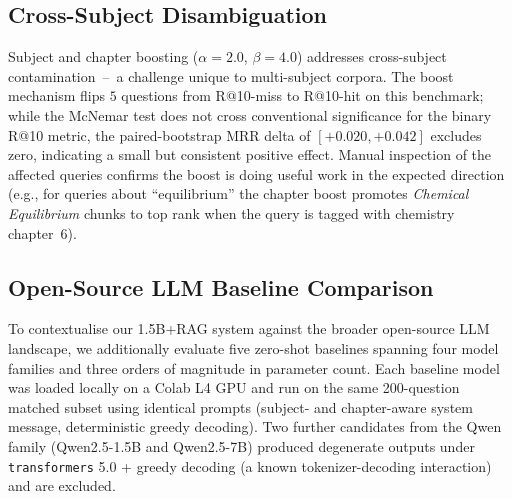 \documentclass[conference]{IEEEtran}
\begin{document}
\subsection{Cross-Subject Disambiguation}
Subject and chapter boosting ($\alpha=2.0$, $\beta=4.0$) addresses cross-subject contamination~--~a challenge unique to multi-subject corpora. The boost mechanism flips $5$ questions from R@10-miss to R@10-hit on this benchmark; while the McNemar test does not cross conventional significance for the binary R@10 metric, the paired-bootstrap MRR delta of $[+0.020, +0.042]$ excludes zero, indicating a small but consistent positive effect. Manual inspection of the affected queries confirms the boost is doing useful work in the expected direction (e.g., for queries about ``equilibrium'' the chapter boost promotes \emph{Chemical Equilibrium} chunks to top rank when the query is tagged with chemistry chapter~6).

\subsection{Open-Source LLM Baseline Comparison}\label{sec:llm_baselines}
To contextualise our 1.5B+RAG system against the broader open-source LLM landscape, we additionally evaluate five zero-shot baselines spanning four model families and three orders of magnitude in parameter count. Each baseline model was loaded locally on a Colab L4 GPU and run on the same 200-question matched subset using identical prompts (subject- and chapter-aware system message, deterministic greedy decoding). Two further candidates from the Qwen family (Qwen2.5-1.5B and Qwen2.5-7B) produced degenerate outputs under \texttt{transformers} 5.0 + greedy decoding (a known tokenizer-decoding interaction) and are excluded.
\end{document}
